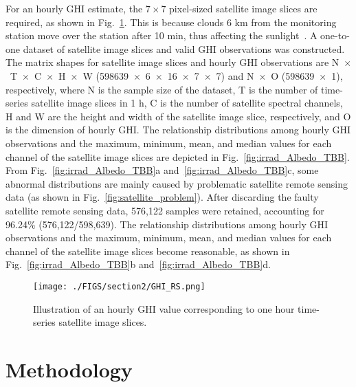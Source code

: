 \documentclass[review]{elsarticle}
\begin{document}
For an hourly GHI estimate, the $\mathrm{7\times7}$ pixel-sized satellite image slices are required, as shown in Fig.~\ref{fig:GHI_RS}.
This is because clouds 6 km from the monitoring station move over the station after 10 min, thus affecting the sunlight~\citep{Hakuba2014JD021946, JIANG2019109327}.
A one-to-one dataset of satellite image slices and valid GHI observations was constructed.
The matrix shapes for satellite image slices and hourly GHI observations are N~$\times$~T~$\times$~C~$\times$~H~$\times$~W (598639~$\times$~6~$\times$~16~$\times$~7~$\times$~7) and N~$\times$~O (598639~$\times$~1), respectively, where N is the sample size of the dataset, T is the number of time-series satellite image slices in 1 h, C is the number of satellite spectral channels, H and W are the height and width of the satellite image slice, respectively, and O is the dimension of hourly GHI.
The relationship distributions among hourly GHI observations and the maximum, minimum, mean, and median values for each channel of the satellite image slices are depicted in Fig.~\ref{fig:irrad_Albedo_TBB}.
From Fig.~\ref{fig:irrad_Albedo_TBB}a and~\ref{fig:irrad_Albedo_TBB}c, some abnormal distributions are mainly caused by problematic satellite remote sensing data (as shown in Fig.~\ref{fig:satellite_problem}).
After discarding the faulty satellite remote sensing data, 576,122 samples were retained, accounting for 96.24\% (576,122/598,639).
The relationship distributions among hourly GHI observations and the maximum, minimum, mean, and median values for each channel of the satellite image slices become reasonable, as shown in Fig.~\ref{fig:irrad_Albedo_TBB}b and~\ref{fig:irrad_Albedo_TBB}d.

\begin{figure}[!htbp]
    \centering
    \vspace{-0mm}
    \texttt{[image: ./FIGS/section2/GHI\_RS.png]}
    \caption{Illustration of an hourly GHI value corresponding to one hour time-series satellite image slices.}
    \label{fig:GHI_RS}
\end{figure}


\section{Methodology}
\label{section:Methodology}
\end{document}
